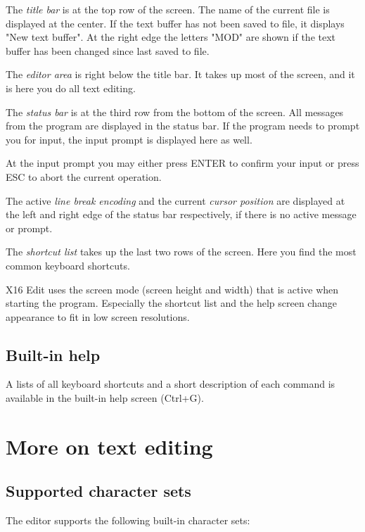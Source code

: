 \documentclass{article}
\begin{document}
        The \textit{title bar} is at the top row of the screen. The name of the current file
        is displayed at the center. If the text buffer has not been saved to file, it displays
        "New text buffer". At the right edge the letters "MOD" are shown if the
        text buffer has been changed since last saved to file.

        The \textit{editor area} is right below the title bar. It takes up most of the screen, and
        it is here you do all text editing.

        The \textit{status bar} is at the third row from the bottom of the screen. All messages
        from the program are displayed in the status bar. If the program needs to prompt you
        for input, the input prompt is displayed here as well. 
        
        At the input prompt you may either press ENTER to confirm your input or press ESC 
        to abort the current operation.

        The active \textit{line break encoding} and the current \textit{cursor position} are displayed at the left and right edge of the status bar respectively, if
        there is no active message or prompt.

        The \textit{shortcut list} takes up the last two rows of the screen. Here you find
        the most common keyboard shortcuts.
        
        X16 Edit uses the screen mode (screen height and width) that is active when starting
        the program. Especially the shortcut list and the help screen change appearance to fit in 
        low screen resolutions.

    \subsection{Built-in help}
        A lists of all keyboard shortcuts and a short description 
        of each command is available in the built-in help screen (Ctrl+G). 
    
\section{More on text editing}

    \subsection{Supported character sets}
        The editor supports the following built-in character sets:
\end{document}
